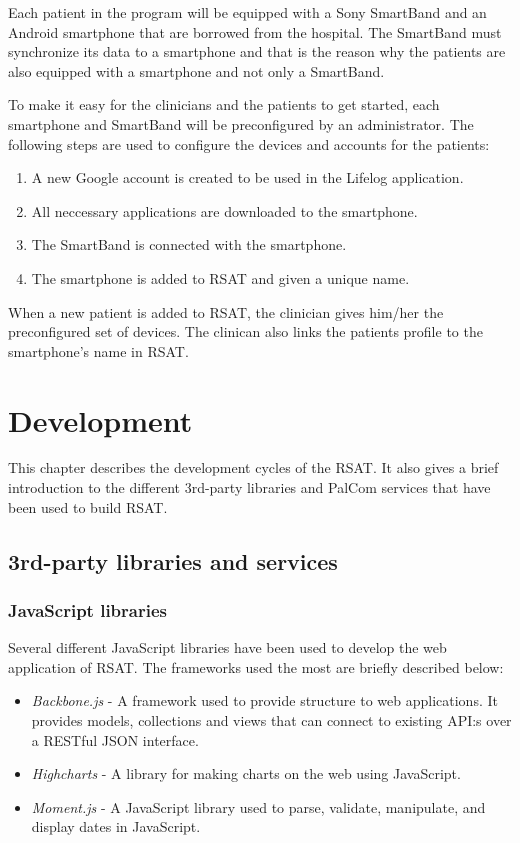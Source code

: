 \documentclass{cslthse-msc}
\begin{document}
Each patient in the program will be equipped with a Sony SmartBand and an Android smartphone that are borrowed from the hospital. The SmartBand must synchronize its data to a smartphone and that is the reason why the patients are also equipped with a smartphone and not only a SmartBand.   

To make it easy for the clinicians and the patients to get started, each smartphone and SmartBand will be  preconfigured by an administrator. The following steps are used to configure the devices and accounts for the patients:

\begin{enumerate}
    \item{A new Google account is created to be used in the Lifelog application.}
    \item{All neccessary applications are downloaded to the smartphone.}
    \item{The SmartBand is connected with the smartphone.}
    \item{The smartphone is added to RSAT and given a unique name.}
\end{enumerate}

When a new patient is added to RSAT, the clinician gives him/her the preconfigured set of devices. The clinican also links the patients profile to the smartphone's name in RSAT. 


\chapter{Development}
This chapter describes the development cycles of the RSAT. It also gives a brief introduction to the different 3rd-party libraries and PalCom services that have been used to build RSAT.

\section{3rd-party libraries and services}

\subsection{JavaScript libraries}
Several different JavaScript libraries have been used to develop the web application of RSAT. The frameworks used the most are briefly described below: 

\begin{itemize}
    \item \emph{Backbone.js} - A framework used to provide structure to web applications. It provides models, collections and views that can connect to existing API:s over a RESTful JSON interface\cite{osmani2013developing}. 
    \item \emph{Highcharts} - A library for making charts on the web using JavaScript\cite{kuan2012learning}.
    \item \emph{Moment.js} - A JavaScript library used to parse, validate, manipulate, and display dates in JavaScript\cite{moment}.
\end{itemize}
\end{document}
